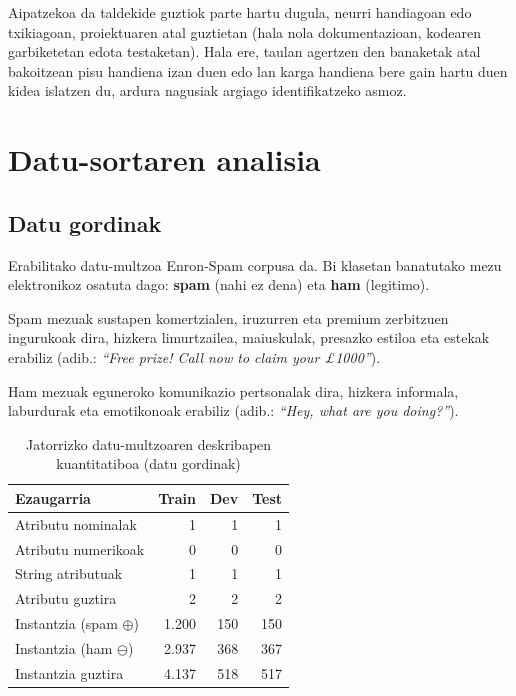 \documentclass[12pt, a4paper]{article}
\begin{document}
Aipatzekoa da taldekide guztiok parte hartu dugula, neurri handiagoan edo txikiagoan, proiektuaren atal guztietan (hala nola dokumentazioan, kodearen garbiketetan edota testaketan). Hala ere, taulan agertzen den banaketak atal bakoitzean pisu handiena izan duen edo lan karga handiena bere gain hartu duen kidea islatzen du, ardura nagusiak argiago identifikatzeko asmoz.

\newpage
\section{Datu-sortaren analisia}

\subsection{Datu gordinak}

Erabilitako datu-multzoa Enron-Spam corpusa da. Bi klasetan banatutako
mezu elektronikoz osatuta dago: \textbf{spam} (nahi ez dena) eta \textbf{ham} (legitimo).

Spam mezuak sustapen komertzialen, iruzurren eta premium zerbitzuen ingurukoak dira,
hizkera limurtzailea, maiuskulak, presazko estiloa eta estekak erabiliz
(adib.: \textit{``Free prize! Call now to claim your \pounds 1000''}).

Ham mezuak eguneroko komunikazio pertsonalak dira, hizkera informala,
laburdurak eta emotikonoak erabiliz (adib.: \textit{``Hey, what are you doing?''}).

\begin{table}[H]
    \centering
    \caption{Jatorrizko datu-multzoaren deskribapen kuantitatiboa (datu gordinak)}
    \begin{tabular}{lrrr}
        \toprule
        \textbf{Ezaugarria} & \textbf{Train} & \textbf{Dev} & \textbf{Test} \\
        \midrule
        Atributu nominalak  & 1     & 1     & 1     \\
        Atributu numerikoak & 0     & 0     & 0     \\
        String atributuak   & 1     & 1     & 1     \\
        Atributu guztira    & 2     & 2     & 2     \\
        \midrule
        Instantzia (spam $\oplus$)  & 1.200 & 150   & 150   \\
        Instantzia (ham $\ominus$)  & 2.937 & 368   & 367   \\
        Instantzia guztira          & 4.137 & 518   & 517   \\
        \bottomrule
    \end{tabular}
    \label{tab:datuak_gordinak}
\end{table}
\end{document}
